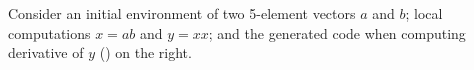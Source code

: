 {\begin{code}[hide]
\AgdaSymbol{))}\AgdaSpace{}%
\AgdaSymbol{(}\AgdaSpace{}%
\AgdaOperator{\AgdaInductiveConstructor{,}}\AgdaSpace{}%
\AgdaSymbol{)}\AgdaSpace{}%
\AgdaSymbol{=}\AgdaSpace{}%
\AgdaSpace{}%
\AgdaSpace{}%
\AgdaOperator{\AgdaInductiveConstructor{,}}\AgdaSpace{}%
\AgdaSpace{}%
\AgdaSymbol{(}\AgdaSpace{}%
\AgdaSymbol{)}\AgdaSpace{}%
\<%
\end{code}
Consider an initial environment of two 5-element vectors $a$ and $b$; local
computations $x = ab$ and $y = xx$; and the generated code when computing derivative
of $y$ () on the right.
\begin{mathpar}
\end{mathpar}}
